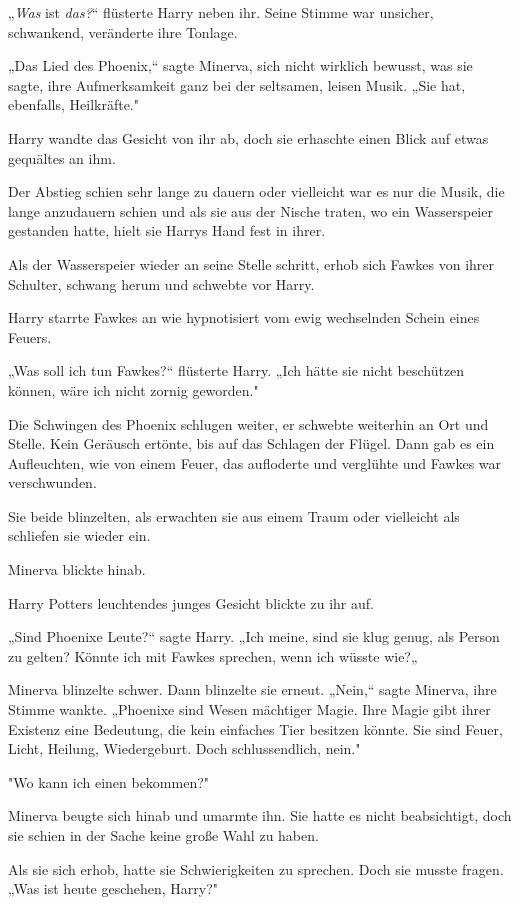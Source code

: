{„\emph{Was} ist \emph{das?}“ flüsterte Harry neben ihr. Seine Stimme war unsicher, schwankend, veränderte ihre Tonlage.

„Das Lied des Phoenix,“ sagte Minerva, sich nicht wirklich bewusst, was sie sagte, ihre Aufmerksamkeit ganz bei der seltsamen, leisen Musik. „Sie hat, ebenfalls, Heilkräfte."

Harry wandte das Gesicht von ihr ab, doch sie erhaschte einen Blick auf etwas gequältes an ihm.

Der Abstieg schien sehr lange zu dauern oder vielleicht war es nur die Musik, die lange anzudauern schien und als sie aus der Nische traten, wo ein Wasserspeier gestanden hatte, hielt sie Harrys Hand fest in ihrer.

Als der Wasserspeier wieder an seine Stelle schritt, erhob sich Fawkes von ihrer Schulter, schwang herum und schwebte vor Harry.

Harry starrte Fawkes an wie hypnotisiert vom ewig wechselnden Schein eines Feuers.

„Was soll ich tun Fawkes?“ flüsterte Harry. „Ich hätte sie nicht beschützen können, wäre ich nicht zornig geworden."

Die Schwingen des Phoenix schlugen weiter, er schwebte weiterhin an Ort und Stelle. Kein Geräusch ertönte, bis auf das Schlagen der Flügel. Dann gab es ein Aufleuchten, wie von einem Feuer, das aufloderte und verglühte und Fawkes war verschwunden.

Sie beide blinzelten, als erwachten sie aus einem Traum oder vielleicht als schliefen sie wieder ein.

Minerva blickte hinab.

Harry Potters leuchtendes junges Gesicht blickte zu ihr auf.

„Sind Phoenixe Leute?“ sagte Harry. „Ich meine, sind sie klug genug, als Person zu gelten? Könnte ich mit Fawkes sprechen, wenn ich wüsste wie?„

Minerva blinzelte schwer. Dann blinzelte sie erneut. „Nein,“ sagte Minerva, ihre Stimme wankte. „Phoenixe sind Wesen mächtiger Magie. Ihre Magie gibt ihrer Existenz eine Bedeutung, die kein einfaches Tier besitzen könnte. Sie sind Feuer, Licht, Heilung, Wiedergeburt. Doch schlussendlich, nein."

"Wo kann ich einen bekommen?"

Minerva beugte sich hinab und umarmte ihn. Sie hatte es nicht beabsichtigt, doch sie schien in der Sache keine große Wahl zu haben.

Als sie sich erhob, hatte sie Schwierigkeiten zu sprechen. Doch sie musste fragen. „Was ist heute geschehen, Harry?"

}
